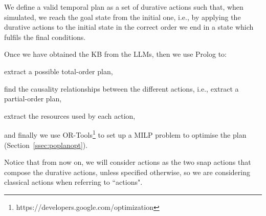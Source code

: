 We define a valid temporal plan as a set of durative actions such that, when simulated, we reach the goal state from the initial one, i.e., by applying the durative actions to the initial state in the correct order we end in a state which fulfils the final conditions.

Once we have obtained the KB from the LLMs, then we use Prolog to: 
\begin{enumerate*}
    \item extract a possible total-order plan, 
    \item find the causality relationships between the different actions, i.e., extract a partial-order plan, 
    \item extract the resources used by each action,
\end{enumerate*}    
and finally we use OR-Tools\footnote{https://developers.google.com/optimization} to set up a MILP problem to optimise the plan (Section~\ref{ssec:poplanopt}).

Notice that from now on, we will consider actions as the two snap actions that compose the durative actions, unless specified otherwise, so we are considering classical actions when referring to ``actions". 
